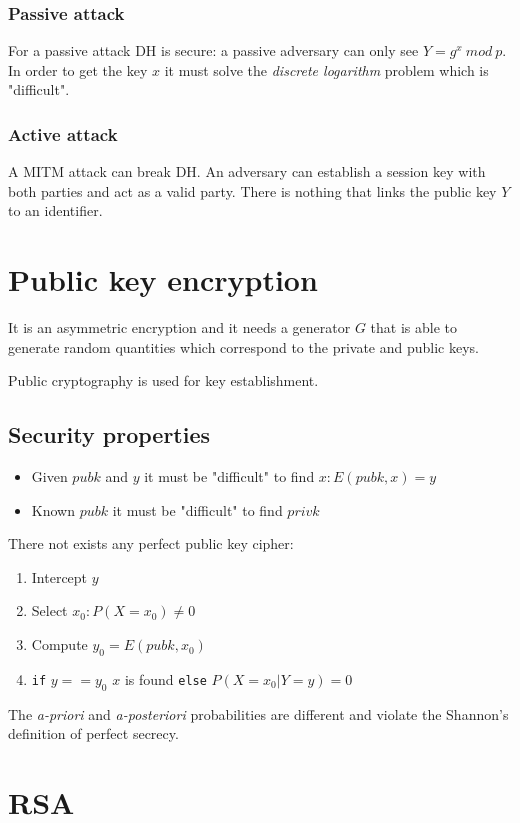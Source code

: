 \documentclass[a4paper,12pt]{article}
\begin{document}
\subsubsection{Passive attack}
For a passive attack DH is secure: a passive adversary can only see $Y = g^x\ mod\ p$. In order to get the key $x$ it must solve the \textit{discrete logarithm} problem which is "difficult".

\subsubsection{Active attack}
A MITM attack can break DH. An adversary can establish a session key with both parties and act as a valid party. There is nothing that links the public key $Y$ to an identifier.

\section{Public key encryption}
It is an asymmetric encryption and it needs a generator $G$ that is able to generate random quantities which correspond to the private and public keys.

Public cryptography is used for key establishment.

\subsection{Security properties}
\begin{itemize}
	\item Given $pubk$ and $y$ it must be "difficult" to find $x : E(pubk, x) = y$
	\item Known $pubk$ it must be "difficult" to find $privk$
\end{itemize}

There not exists any perfect public key cipher:
\begin{enumerate}
	\item Intercept $y$
	\item Select $x_0 : P(X = x_0) \neq 0$
	\item Compute $y_0 = E(pubk, x_0)$
	\item \texttt{if} $y == y_0$ $x$ is found \texttt{else} $P(X=x_0|Y=y) = 0$
\end{enumerate}

The \textit{a-priori} and \textit{a-posteriori} probabilities are different and violate the Shannon's definition of perfect secrecy.

\section{RSA}
\end{document}
